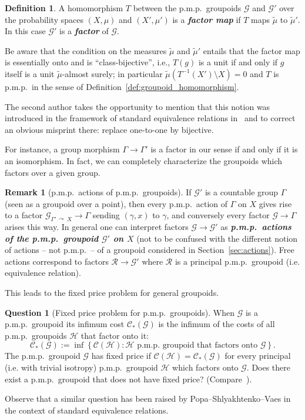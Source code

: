 \documentclass[10pt]{amsart}
\theoremstyle{definition}
\newtheorem{rema}[cdrthm]{Remark}
\newtheorem{defi}[cdrthm]{Definition}
\newtheorem{ques}[cdrthm]{Question}
\newcommand{\defin}[1]{\textbf{\emph{#1}}}
\newcommand{\acting}{\curvearrowright}
\newcommand{\RR}{\mathcal{R}}
\newcommand{\cost}{\mathcal{C}}
\newcommand{\ch}{\mathcal{H}}
\newcommand{\cg}{\mathcal{G}}
\newcommand{\vraicost}{\mathscr{C}}
\newcommand{\pmp}{p.m.p.\ }
\begin{document}
\begin{defi}\label{dfn:factor}
A homomorphism $T$ between the \pmp groupoids $\cg$ and $\cg'$ over the probability spaces $(X,\mu)$ and $(X',\mu')$ is a
\defin{factor map} if $T$ maps $\widetilde \mu$ to $\widetilde \mu'$. In this case $\cg'$ is a
\defin{factor} of $\cg$.
\end{defi}


Be aware that the condition on the measures $\widetilde \mu$ and $\widetilde \mu'$ entails that the factor map is essentially onto and is ``class-bijective'', i.e., $T(g)$ is a unit if and only if $g$ itself is a unit $\widetilde \mu$-almost surely; in particular $\widetilde \mu(T^{-1}(X')\setminus X)=0$ and $T$ is \pmp in the sense of Definition~\ref{def:groupoid_homomorphism}.

The second author takes the opportunity to mention that this notion was introduced in the framework of standard equivalence relations in~\cite[Definition p.~1815 and Lemma~2.3 and 2.4]{Gab05a} and to correct an obvious misprint there: replace one-to-one by bijective.



For instance, a group morphism $\Gamma\to \Gamma'$ is a factor in our sense if and only if it is an isomorphism. In fact, we can completely characterize the groupoids which factors over a given group.
\begin{rema}[\pmp actions of \pmp groupoids]\label{Rem: pmp actions of pmp groupoids}
If $\cg'$ is a countable group $\Gamma$ (seen as a groupoid over a point), then every \pmp action of $\Gamma$ on $X$ gives rise to a factor $\cg_{\Gamma'\,\acting\,X} \to \Gamma$ sending $(\gamma,x)$ to $\gamma$, and conversely every factor $\cg \to \Gamma$ arises this way. In general one can interpret factors $\cg \to \cg'$ as
\defin{\pmp actions of the \pmp groupoid $\cg'$ on $X$} (not to be confused with the different notion of actions -- not \pmp -- of a groupoid considered in Section~\ref{sec:actions}). Free actions correspond to factors $\RR \to \cg'$ where $\RR$ is a principal \pmp groupoid (i.e. equivalence relation).
\end{rema}

This leads to the fixed price problem for general groupoids.
\begin{ques}[Fixed price problem for \pmp groupoids]\label{quest: fixed price for groupoids}
When $\cg$ is a \pmp groupoid its infimum cost $\vraicost_*(\cg)$ is the infimum of the costs of all
\pmp groupoids $\ch$ that factor onto it:
\[
\vraicost_*(\cg):=\inf\left\{\cost (\ch): \ch \text{ \pmp groupoid that factors onto } \cg \right\}.
\]
The \pmp groupoid $\cg$ has fixed price if $\cost (\ch)=\vraicost_*(\cg)$ for every principal (i.e. with trivial isotropy) \pmp groupoid $\ch$ which factors onto $\cg$. Does there exist a \pmp groupoid that does not have fixed price? (Compare~\cite[Question~1.8]{Gab-cost}).
\end{ques}
Observe that a similar question has been raised by Popa--Shlyakhtenko--Vaes \cite{PSV-2018-classif-sub-hyp} in the context of standard equivalence relations.
\end{document}
